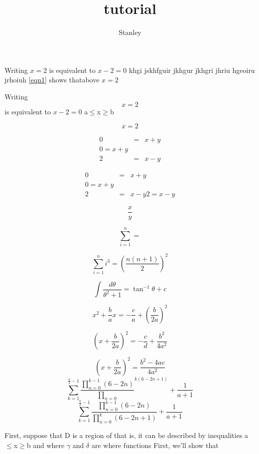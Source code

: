 \documentclass[10pt,a4paper]{article}
\author{Stanley}
\title{tutorial}
\begin{document}
Writing $x=2$ is equivalent to $x-2 = 0$
khgi jskhfguir jkhgur jkhgri jhriu hgeoiru jrhoiuh \eqref{eqn1} shows thatabove $x=2$

	Writing $$x=2$$ is equivalent to $x-2 = 0$  a$\leq$x$\geq$b

\begin{equation}\label{eqn1}
x=2
\end{equation}

\begin{eqnarray}
0&=&x+y \label{sys1}\\ 0=x+y \\
2 &=& x-y \label{sys2}
\end{eqnarray}

\begin{eqnarray*}
	0&=&x+y \label{sys1}\\ 0=x+y \\
	2 &=& x-y \label{sys2} 2 = x-y
\end{eqnarray*}


$$\frac{x}{y}$$



$$\sum_{i=1}^{n}=$$

$$\sum_{i=1}^n i^3= \left( \frac{n(n+1)}{2}\right)^{2} $$


$$\int \frac{d\theta}{\theta^{2}+1}=\tan^{-1}\theta+c$$

$$x^{2}+\frac{b}{a}x=-\frac{c}{a}+\left(\frac{b}{2a}\right)^{2}$$

$$\left(x+\frac{b}{2a}\right)^{2}=-\frac{c}{d}+\frac{b^{2}}{4a^{2}}$$

$$\left(x+\frac{b}{2a}\right)^{2}=\frac{b^{2}-4ac}{4a^{2}}$$
$$\sum_{k=1}^{\frac{a}{2}-1}\frac{\prod_{n=0}^{k-1}\left(6-2n\right)}{\prod_{n=0}}^{k \left(6-2n+1\right)}+\frac{1}{a+1}$$
$$\sum_{k=1}^{\frac{a}{2}-1}\frac{\displaystyle\prod_{n=0}^{k-1}\left(6-2n\right)}{\displaystyle\prod_{n=0}^{k}\left(6-2n+1\right)}+\frac{1}{a+1}$$

First, suppose that D is a region of  that is, it can be described by inequalities a$\leq$x$\geq$b and where $\gamma$ and $\delta$ are  where functions First, we’ll show that
\end{document}
